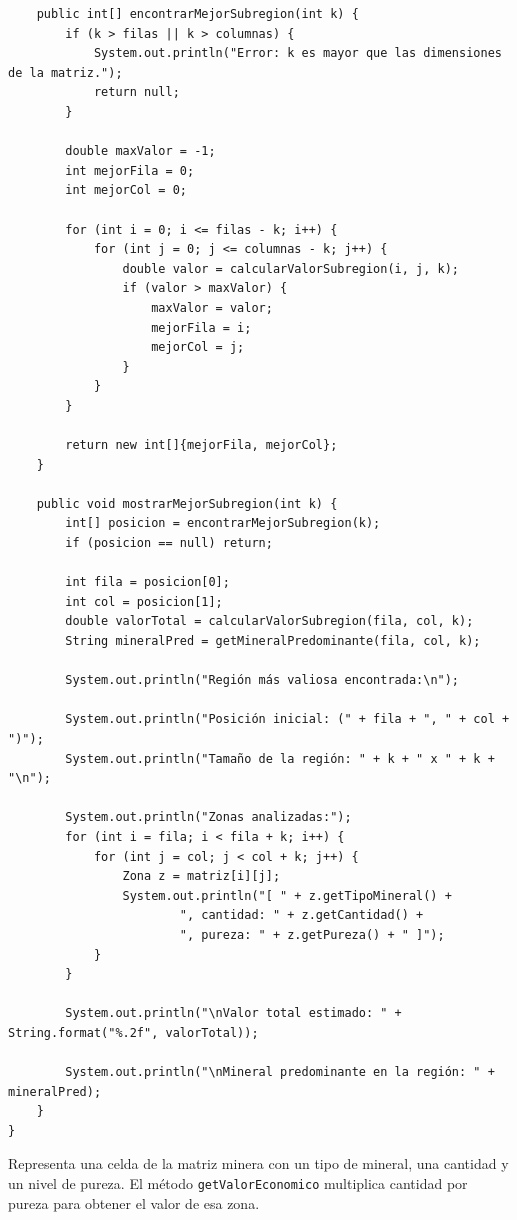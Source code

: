 \documentclass[12pt]{article}
\begin{document}
\begin{verbatim}
    public int[] encontrarMejorSubregion(int k) {
        if (k > filas || k > columnas) {
            System.out.println("Error: k es mayor que las dimensiones de la matriz.");
            return null;
        }

        double maxValor = -1;
        int mejorFila = 0;
        int mejorCol = 0;

        for (int i = 0; i <= filas - k; i++) {
            for (int j = 0; j <= columnas - k; j++) {
                double valor = calcularValorSubregion(i, j, k);
                if (valor > maxValor) {
                    maxValor = valor;
                    mejorFila = i;
                    mejorCol = j;
                }
            }
        }

        return new int[]{mejorFila, mejorCol};
    }

    public void mostrarMejorSubregion(int k) {
        int[] posicion = encontrarMejorSubregion(k);
        if (posicion == null) return;

        int fila = posicion[0];
        int col = posicion[1];
        double valorTotal = calcularValorSubregion(fila, col, k);
        String mineralPred = getMineralPredominante(fila, col, k);

        System.out.println("Región más valiosa encontrada:\n");

        System.out.println("Posición inicial: (" + fila + ", " + col + ")");
        System.out.println("Tamaño de la región: " + k + " x " + k + "\n");

        System.out.println("Zonas analizadas:");
        for (int i = fila; i < fila + k; i++) {
            for (int j = col; j < col + k; j++) {
                Zona z = matriz[i][j];
                System.out.println("[ " + z.getTipoMineral() +
                        ", cantidad: " + z.getCantidad() +
                        ", pureza: " + z.getPureza() + " ]");
            }
        }

        System.out.println("\nValor total estimado: " + String.format("%.2f", valorTotal));

        System.out.println("\nMineral predominante en la región: " + mineralPred);
    }
}

\end{verbatim}

Representa una celda de la matriz minera con un tipo de mineral, una cantidad 
y un nivel de pureza. El método \texttt{getValorEconomico} multiplica cantidad 
por pureza para obtener el valor de esa zona.
\end{document}
